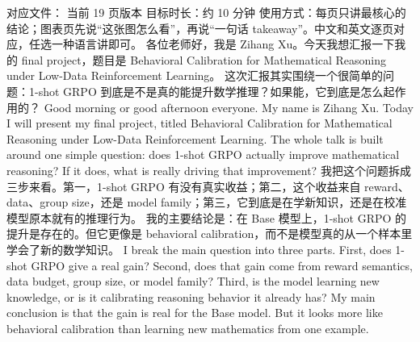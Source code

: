 \markdownRendererDocumentBegin
{}\markdownRendererInterblockSeparator
{}对应文件： 当前 19 页版本\markdownRendererLineBreak
{}目标时长：约 10 分钟\markdownRendererLineBreak
{}使用方式：每页只讲最核心的结论；图表页先说“这张图怎么看”，再说“一句话 takeaway”。中文和英文逐页对应，任选一种语言讲即可。\markdownRendererInterblockSeparator
{}\markdownRendererHorizontalRule{}\markdownRendererInterblockSeparator
{}\markdownRendererInterblockSeparator
{}\markdownRendererInterblockSeparator
{}各位老师好，我是 Zihang Xu。今天我想汇报一下我的 final project，题目是 Behavioral Calibration for Mathematical Reasoning under Low-Data Reinforcement Learning。\markdownRendererInterblockSeparator
{}这次汇报其实围绕一个很简单的问题：1-shot GRPO 到底是不是真的能提升数学推理？如果能，它到底是怎么起作用的？\markdownRendererInterblockSeparator
{}\markdownRendererInterblockSeparator
{}Good morning or good afternoon everyone. My name is Zihang Xu. Today I will present my final project, titled Behavioral Calibration for Mathematical Reasoning under Low-Data Reinforcement Learning.\markdownRendererInterblockSeparator
{}The whole talk is built around one simple question: does 1-shot GRPO actually improve mathematical reasoning? If it does, what is really driving that improvement?\markdownRendererInterblockSeparator
{}\markdownRendererHorizontalRule{}\markdownRendererInterblockSeparator
{}\markdownRendererInterblockSeparator
{}\markdownRendererInterblockSeparator
{}我把这个问题拆成三步来看。第一，1-shot GRPO 有没有真实收益；第二，这个收益来自 reward、data、group size，还是 model family；第三，它到底是在学新知识，还是在校准模型原本就有的推理行为。\markdownRendererInterblockSeparator
{}我的主要结论是：在 Base 模型上，1-shot GRPO 的提升是存在的。但它更像是 behavioral calibration，而不是模型真的从一个样本里学会了新的数学知识。\markdownRendererInterblockSeparator
{}\markdownRendererInterblockSeparator
{}I break the main question into three parts. First, does 1-shot GRPO give a real gain? Second, does that gain come from reward semantics, data budget, group size, or model family? Third, is the model learning new knowledge, or is it calibrating reasoning behavior it already has?\markdownRendererInterblockSeparator
{}My main conclusion is that the gain is real for the Base model. But it looks more like behavioral calibration than learning new mathematics from one example.\markdownRendererInterblockSeparator
